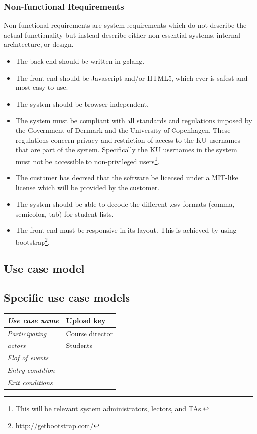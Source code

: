 \documentclass[11pt,a4paper]{report}
\begin{document}
\subsubsection{Non-functional Requirements}
Non-functional requirements are system requirements which do not describe the actual functionality but instead describe either non-essential systems, internal architecture, or design.
\begin{itemize}
\item The back-end should be written in golang.
\item The front-end should be Javascript and/or HTML5, which ever is safest and most easy to use.
\item The system should be browser independent.
\item The system must be compliant with all standards and regulations imposed by the Government of Denmark and the University of Copenhagen. These regulations concern privacy and restriction of access to the KU usernames that are part of the system. Specifically the KU usernames in the system must not be accessible to non-privileged users\footnote{This will be relevant system administrators, lectors, and TAs.}.
\item The customer has decreed that the software be licensed under a MIT-like license which will be provided by the customer.
\item The system should be able to decode the different .csv-formats (comma, semicolon, tab) for student lists.
\item The front-end must be responsive in its layout. This is achieved by using bootstrap\footnote{http://getbootstrap.com/}.
\end{itemize}

\subsection{Use case model}

\subsection{Specific use case models}
\begin{tabular}{ll}
    \toprule
    \textit{Use case name} & Upload key \\
    \midrule
    \textit{Participating} & Course director \\ 
    \textit{actors}& Students \\
    \midrule
    \textit{Flof of events} &  \\
    \midrule
    \textit{Entry condition} &  \\
    \midrule
    \textit{Exit conditions} &  \\
    \bottomrule
\end{tabular}
\end{document}
